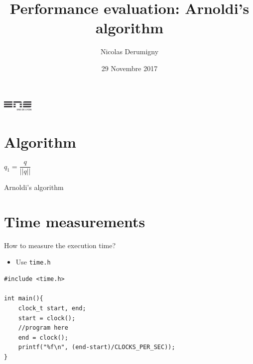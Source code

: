 \documentclass{beamer}
\title[MPNA]{Performance evaluation: Arnoldi's algorithm}
\author[N.D.]{Nicolas Derumigny}
\institute[]{ENS Lyon}
\date{29 Novembre 2017}
\begin{document}
\begin{frame}
	\titlepage
	\begin{center}
	\includegraphics[height=0.5cm]{logoens.pdf}

	\end{center}
\end{frame}

\section{Algorithm}
\begin{frame}
\begin{algorithm}[H]
$q_1 = \dfrac{q}{||q||}$ \\
\caption{Arnoldi's algorithm}
\end{algorithm}
\end{frame}

\section{Time measurements}
\begin{frame}[fragile]{How to measure the execution time?}
\begin{itemize}
\item Use \texttt{time.h}
\end{itemize}
\bigskip
\begin{lstlisting}[frame=single]
#include <time.h>

int main(){
	clock_t start, end;
	start = clock();
	//program here
	end = clock();
	printf("%f\n", (end-start)/CLOCKS_PER_SEC));
}
\end{lstlisting}
\end{frame}
\end{document}
